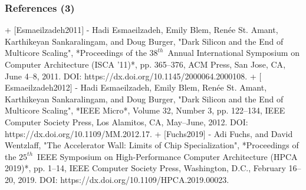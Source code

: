 \documentclass[xcolor={usenames,dvipsnames},hyperref={hyperindex,bookmarks}]{beamer}
\begin{document}
\begin{frame}
	\frametitle{References (3)}

+ $[$Esmaeilzadeh2011$]$
	- Hadi Esmaeilzadeh, Emily Blem, Ren{\'{e}}e {St. Amant}, Karthikeyan Sankaralingam, and Doug Burger, "Dark Silicon and the End of Multicore Scaling", *Proceedings of the $38^{th}$\ Annual International Symposium on Computer Architecture ({ISCA '11})*, pp. 365--376, {ACM} Press, San Jose, {CA}, June 4--8, 2011. DOI: https://dx.doi.org/10.1145/2000064.2000108.
+ $[$Esmaeilzadeh2012$]$
	- Hadi Esmaeilzadeh, Emily Blem, Ren{\'{e}}e {St. Amant}, Karthikeyan Sankaralingam, and Doug Burger, "Dark Silicon and the End of Multicore Scaling", *{IEEE} Micro*, Volume 32, Number 3, pp. 122--134, {IEEE} Computer Society Press, Los Alamitos, {CA}, May--June, 2012. DOI: https://dx.doi.org/10.1109/MM.2012.17.
+ $[$Fuchs2019$]$
	- Adi Fuchs, and David Wentzlaff, "The Accelerator Wall: Limits of Chip Specialization", *Proceedings of the $25^{th}$\ {IEEE} Symposium on High-Performance Computer Architecture ({HPCA} 2019)*, pp. 1--14, {IEEE} Computer Society Press, Washington, {D.C.}, February 16--20, 2019. DOI: https://dx.doi.org/10.1109/HPCA.2019.00023.


\end{frame}
\end{document}
